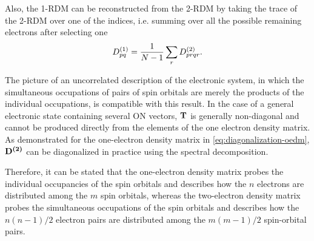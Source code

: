 Also, the 1-RDM can be reconstructed from the 2-RDM by taking the trace of the
2-RDM over one of the indices, i.e. summing over all the possible remaining
electrons after selecting one 
\begin{equation}
    D^{\left( 1 \right)}_{pq} =
    \frac{1}{N-1} \sum_{r} D^{\left( 2 \right)}_{prqr}
    .
\end{equation}

The picture of an uncorrelated description of the electronic system, in which 
the simultaneous occupations of pairs of spin orbitals are merely the products 
of the individual occupations, is compatible with this result.
In the case of a general electronic state containing several ON vectors, $\boldsymbol{\mathrm{T}}$
is generally non-diagonal and cannot be produced directly from the elements of 
the one electron density matrix. As demonstrated for the one-electron density 
matrix in \cref{eq:diagonalization-oedm}, $ \boldsymbol{\mathrm{D^{\left( 2 \right)}}}$ can be diagonalized
in practice using the spectral decomposition.

Therefore, it can be stated that the one-electron density matrix probes the
individual occupancies of the spin orbitals and describes how the $n$ electrons
are distributed among the $m$ spin orbitals, whereas the two-electron density
matrix probes the simultaneous occupations of the spin orbitals and describes
how the $n\left( n-1 \right) /2$ electron pairs are distributed among the 
$m\left( m-1 \right) /2$ spin-orbital pairs.

